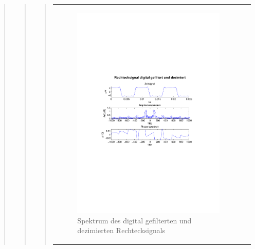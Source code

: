 \begin{quote}
\begin{quote}
\begin{quote}
\begin{center}
\begin{tabular}{ll}
\begin{minipage}{0.6\textwidth}
                        \begin{figure}[H]
                            \label{fig:}
                            \includegraphics[scale=0.65, trim = 3cm 9cm 3cm
                            8.5cm, clip]{./Bilder/rechteck15kHz_digifilt+dezi}
                            \caption{Spektrum des digital gefilterten und
                            dezimierten Rechtecksignals}
                        \end{figure}
                    \vspace{-1.5em}
    
                    \end{minipage}
    
                \end{tabular}
                \end{center}
    			    	

\end{quote}
\end{quote}
\end{quote}
